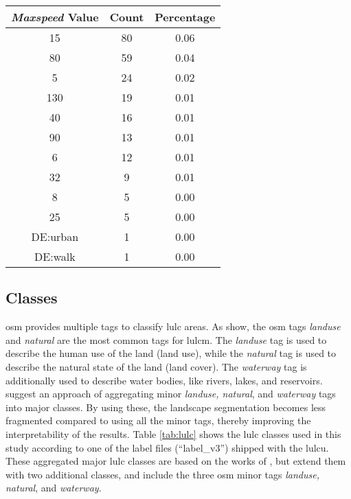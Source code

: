 \begin{table}[htb]
\begin{minipage}{.45\textwidth}
    \end{minipage}
    \begin{minipage}{.45\textwidth}
        \centering
        \begin{tabular}{ccc}
            \toprule
            \textbf{\emph{Maxspeed} Value} & \textbf{Count} & \textbf{Percentage}\\
            \midrule
            15       & 80     & 0.06 \\
            80       & 59     & 0.04 \\
            5        & 24     & 0.02 \\
            130      & 19     & 0.01 \\
            40       & 16     & 0.01 \\
            90       & 13     & 0.01 \\
            6        & 12     & 0.01 \\
            32       & 9      & 0.01 \\
            8        & 5      & 0.00 \\
            25       & 5      & 0.00 \\
            DE:urban & 1      & 0.00 \\
            DE:walk  & 1      & 0.00 \\
            \bottomrule
        \end{tabular}
    \end{minipage}
    \label{tab:maxspeed}
\end{table}

\subsection{ Classes}
\label{subsec:labels}

\gls{osm} provides multiple tags to classify \gls{lulc} areas. As \textcite{Yang.Fu.ea2017} show, the \gls{osm} tags \emph{landuse} and \emph{natural} are the most common tags for \gls{lulcm}. The \emph{landuse} tag is used to describe the human use of the land (land use), while the \emph{natural} tag is used to describe the natural state of the land (land cover). The \emph{waterway} tag is additionally used to describe water bodies, like rivers, lakes, and reservoirs. \textcite{Schott.Zell.ea2024} suggest an approach of aggregating minor \emph{landuse, natural}, and \emph{waterway} tags into major classes. By using these, the landscape segmentation becomes less fragmented compared to using all the minor tags, thereby improving the interpretability of the results. Table \ref{tab:lulc} shows the \gls{lulc} classes used in this study according to one of the label files (\enquote{label\_v3}) shipped with the \gls{lulcu}. These aggregated major \gls{lulc} classes are based on the works of \textcite{Schott.Zell.ea2024}, but extend them with two additional classes, and include the three \gls{osm} minor tags \emph{landuse, natural}, and \emph{waterway}.

